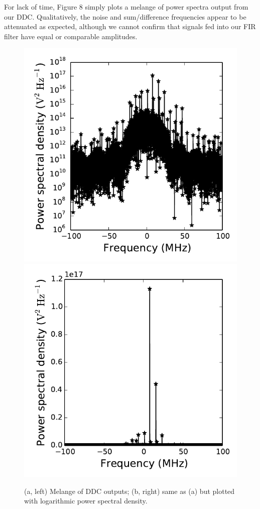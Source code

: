 \documentclass[11pt]{article}
\begin{document}
For lack of time, Figure 8 simply plots a melange of power spectra output from
our DDC.
Qualitatively, the noise and sum/difference frequencies appear to be attenuated
as expected, although we cannot confirm that signals fed into our FIR filter
have equal or comparable amplitudes.

\begin{figure}[!htb]
    \centering
    \includegraphics[scale=0.7]{scripts/DDC_response_log.pdf}
    \includegraphics[scale=0.7]{scripts/DDC_response_lin.pdf}
    \caption{(a, left) Melange of DDC outputs; (b, right) same as (a) but
    plotted with logarithmic power spectral density.}
\end{figure}
\end{document}
